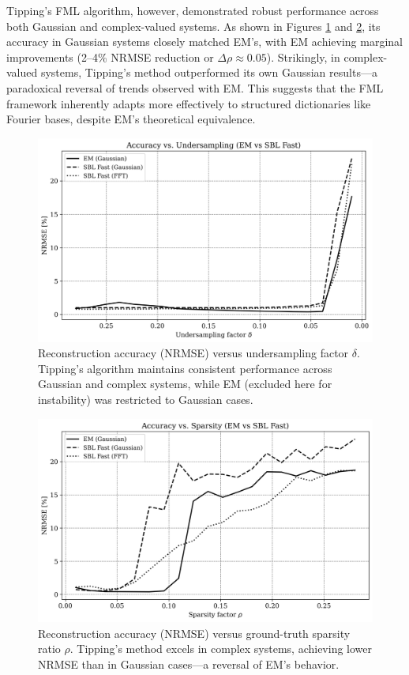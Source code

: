 \documentclass{article}
\begin{document}
Tipping’s FML algorithm, however, demonstrated robust performance across both Gaussian and complex-valued systems. As shown in Figures \ref{fig:accuracy_vs_undersampling_EMSB} and \ref{fig:accuracy_vs_sparsity_EMSB}, its accuracy in Gaussian systems closely matched EM’s, with EM achieving marginal improvements (2–4\% NRMSE reduction or $\Delta\rho\approx 0.05$). Strikingly, in complex-valued systems, Tipping’s method outperformed its own Gaussian results—a paradoxical reversal of trends observed with EM. This suggests that the FML framework inherently adapts more effectively to structured dictionaries like Fourier bases, despite EM’s theoretical equivalence.
\begin{figure}[H]
    \centering
    \includegraphics[width=0.75\linewidth]{Figures/accuracy_vs_undersampling_EMvsSB_woEMFFT.png}
    \caption{Reconstruction accuracy (NRMSE) versus undersampling factor $\delta$. Tipping’s algorithm maintains consistent performance across Gaussian and complex systems, while EM (excluded here for instability) was restricted to Gaussian cases.}
    \label{fig:accuracy_vs_undersampling_EMSB}
\end{figure}

\begin{figure}[H]
    \centering
    \includegraphics[width=0.75\linewidth]{Figures/accuracy_vs_sparsity_EMvsSB_woEMFFT.png}
    \caption{Reconstruction accuracy (NRMSE) versus ground-truth sparsity ratio $\rho$. Tipping’s method excels in complex systems, achieving lower NRMSE than in Gaussian cases—a reversal of EM’s behavior.}
    \label{fig:accuracy_vs_sparsity_EMSB}
\end{figure}
\end{document}
